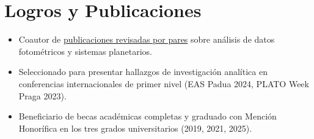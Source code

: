 \documentclass[10pt,a4paper]{article}
\begin{document}
\section*{Logros y Publicaciones}
\begin{itemize}[leftmargin=1.5em]
    \item Coautor de \href{https://ui.adsabs.harvard.edu/search/fq...}{publicaciones revisadas por pares} sobre análisis de datos fotométricos y sistemas planetarios.
    \item Seleccionado para presentar hallazgos de investigación analítica en conferencias internacionales de primer nivel (EAS Padua 2024, PLATO Week Praga 2023).
    \item Beneficiario de becas académicas completas y graduado con Mención Honorífica en los tres grados universitarios (2019, 2021, 2025).
\end{itemize}
\end{document}
